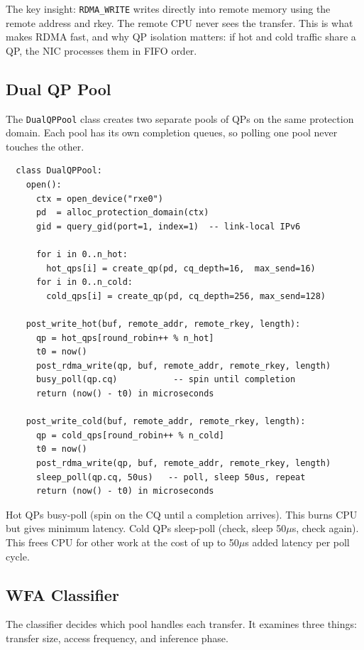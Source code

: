 \documentclass[11pt]{article}
\begin{document}
The key insight: \texttt{RDMA\_WRITE} writes directly into remote memory using the remote address and rkey. The remote CPU never sees the transfer. This is what makes RDMA fast, and why QP isolation matters: if hot and cold traffic share a QP, the NIC processes them in FIFO order.

\subsection{Dual QP Pool}

The \texttt{DualQPPool} class creates two separate pools of QPs on the same protection domain. Each pool has its own completion queues, so polling one pool never touches the other.

\begin{verbatim}
  class DualQPPool:
    open():
      ctx = open_device("rxe0")
      pd  = alloc_protection_domain(ctx)
      gid = query_gid(port=1, index=1)  -- link-local IPv6

      for i in 0..n_hot:
        hot_qps[i] = create_qp(pd, cq_depth=16,  max_send=16)
      for i in 0..n_cold:
        cold_qps[i] = create_qp(pd, cq_depth=256, max_send=128)

    post_write_hot(buf, remote_addr, remote_rkey, length):
      qp = hot_qps[round_robin++ % n_hot]
      t0 = now()
      post_rdma_write(qp, buf, remote_addr, remote_rkey, length)
      busy_poll(qp.cq)           -- spin until completion
      return (now() - t0) in microseconds

    post_write_cold(buf, remote_addr, remote_rkey, length):
      qp = cold_qps[round_robin++ % n_cold]
      t0 = now()
      post_rdma_write(qp, buf, remote_addr, remote_rkey, length)
      sleep_poll(qp.cq, 50us)   -- poll, sleep 50us, repeat
      return (now() - t0) in microseconds
\end{verbatim}

Hot QPs busy-poll (spin on the CQ until a completion arrives). This burns CPU but gives minimum latency. Cold QPs sleep-poll (check, sleep 50$\mu$s, check again). This frees CPU for other work at the cost of up to 50$\mu$s added latency per poll cycle.

\subsection{WFA Classifier}

The classifier decides which pool handles each transfer. It examines three things: transfer size, access frequency, and inference phase.
\end{document}
